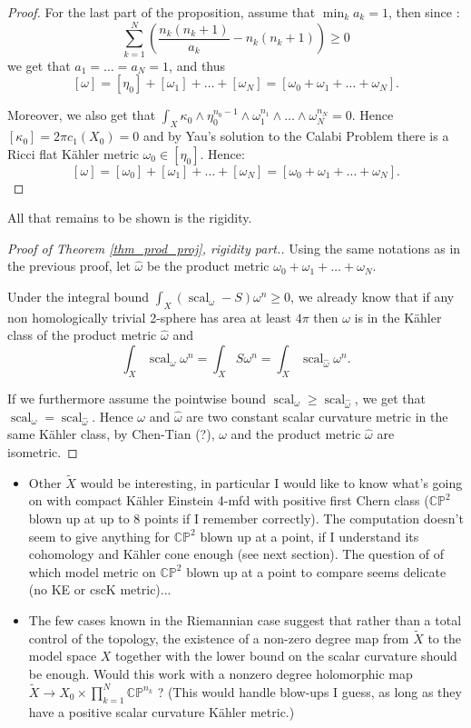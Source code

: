 \documentclass{amsart}
\numberwithin{equation}{section}
\theoremstyle{definition}
\DeclareMathOperator{\scal}{scal}
\begin{document}
\begin{proof}
For the last part of the proposition, assume that $\min_k a_k=1$, then since :
\[\sum_{k=1}^N\left(\frac{n_k(n_k+1)}{a_k}-n_k(n_k+1)\right)\geq 0\] we get that $a_1=\dots=a_N=1$, and thus
\[[\omega]=[\eta_0]+[\omega_1]+\dots+[\omega_N]=[\omega_0+\omega_1+\dots+\omega_N].\]

Moreover, we also get that $\int_X\kappa_0\wedge\eta_0^{n_0-1}\wedge\omega_1^{n_1}\wedge\dots\wedge\omega_N^{n_N}=0$. Hence $[\kappa_0]=2\pi c_1(X_0)=0$ and by Yau's solution to the Calabi Problem there is a Ricci flat K\"ahler metric $\omega_0\in[\eta_0]$. Hence:
\[[\omega]=[\omega_0]+[\omega_1]+\dots+[\omega_N]=[\omega_0+\omega_1+\dots+\omega_N].\]

\end{proof}

All that remains to be shown is the rigidity.
\begin{proof}[Proof of Theorem \ref{thm_prod_proj}, rigidity part.]
    Using the same notations as in the previous proof, let $\hat\omega$ be the product metric $\omega_0+\omega_1+\dots+\omega_N$.

    Under the integral bound $\int_X(\scal_\omega-S)\omega^n\geq 0$, we already know that if any non homologically trivial 2-sphere has area at least $4\pi$ then $\omega$ is in the K\"ahler class of the product metric $\hat\omega$ and \[\int_X\scal_\omega\omega^n=\int_X S\omega^n=\int_X\scal_{\hat\omega}\omega^n.\]

    If we furthermore assume the pointwise bound $\scal_\omega\geq\scal_{\hat\omega}$, we get that $\scal_\omega=\scal_{\hat\omega}$. Hence $\omega$ and $\hat\omega$ are two constant scalar curvature metric in the same K\"ahler class, by Chen-Tian (?), $\omega$ and the product metric $\hat\omega$ are isometric.
\end{proof}



\begin{itemize}
\item Other $\tilde X$ would be interesting, in particular I would like to know what's going on with compact K\"ahler Einstein 4-mfd with positive first Chern class ($\mathbb{CP}^2$ blown up at up to 8 points if I remember correctly). The computation doesn't seem to give anything for $\mathbb{CP}^2$ blown up at a point, if I understand its cohomology and K\"ahler cone enough (see next section). The question of of which model metric on $\mathbb{CP}^2$ blown up at a point to compare seems delicate (no KE or cscK metric)...
\item The few cases known in the Riemannian case suggest that rather than a total control of the topology, the existence of a non-zero degree map from $\tilde X$ to the model space $X$ together with the lower bound on the scalar curvature should be enough. Would this work with a nonzero degree holomorphic map  $\tilde X\to X_0\times\prod_{k=1}^N\mathbb{CP}^{n_k}$ ? (This would handle blow-ups I guess, as long as they have a positive scalar curvature K\"ahler metric.)
\end{itemize}
\end{document}
